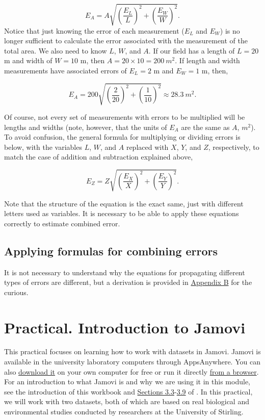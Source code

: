 \documentclass[
]{scrbook}
\begin{document}
\[E_{A} = A \sqrt{\left(\frac{E_{L}}{L} \right)^{2} + \left(\frac{E_{W}}{W} \right)^{2}}.\]
Notice that just knowing the error of each measurement (\(E_{L}\) and \(E_{W}\)) is no longer sufficient to calculate the error associated with the measurement of the total area.
We also need to know \(L\), \(W\), and \(A\).
If our field has a length of \(L = 20\) m and width of \(W = 10\) m, then \(A = 20 \times 10 = 200\:m^{2}\).
If length and width measurements have associated errors of \(E_{L} = 2\) m and \(E_{W} = 1\) m, then,

\[E_{A} = 200 \sqrt{\left(\frac{2}{20} \right)^{2} + \left(\frac{1}{10} \right)^{2}} \approx 28.3\:m^{2}.\]

Of course, not every set of measurements with errors to be multiplied will be lengths and widths (note, however, that the units of \(E_{A}\) are the same as \(A\), \(m^{2}\)).
To avoid confusion, the general formula for multiplying or dividing errors is below, with the variables \(L\), \(W\), and \(A\) replaced with \(X\), \(Y\), and \(Z\), respectively, to match the case of addition and subtraction explained above,

\[E_{Z} = Z \sqrt{\left(\frac{E_{X}}{X} \right)^{2} + \left(\frac{E_{Y}}{Y} \right)^{2}}.\]

Note that the structure of the equation is the exact same, just with different letters used as variables.
It is necessary to be able to apply these equations correctly to estimate combined error.

\hypertarget{applying-formulas-for-combining-errors}{%
\section{Applying formulas for combining errors}\label{applying-formulas-for-combining-errors}}

It is not necessary to understand why the equations for propagating different types of errors are different, but a derivation is provided in \protect\hyperlink{uncertainty_derivation}{Appendix B} for the curious.

\hypertarget{Chapter_8}{%
\chapter{Practical. Introduction to Jamovi}\label{Chapter_8}}

This practical focuses on learning how to work with datasets in Jamovi.
Jamovi is available in the university laboratory computers through AppsAnywhere.
You can also \href{https://www.jamovi.org/download.html}{download it} on your own computer for free or run it directly \href{https://www.jamovi.org/cloud.html}{from a browser}.
For an introduction to what Jamovi is and why we are using it in this module, see the introduction of this workbook and \href{https://davidfoxcroft.github.io/lsj-book/03-Getting-started-with-jamovi.html\#the-spreadsheet}{Sections 3.3}-\href{https://davidfoxcroft.github.io/lsj-book/03-Getting-started-with-jamovi.html\#summary}{3.9} of \citet{Navarro2022}.
In this practical, we will work with two datasets, both of which are based on real biological and environmental studies conducted by researchers at the University of Stirling.
\end{document}
